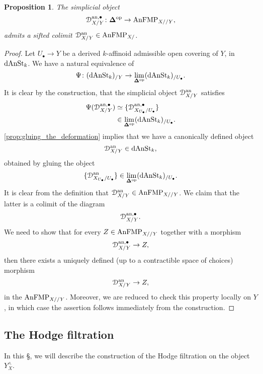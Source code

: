 \documentclass[10pt,a4paper,reqno]{amsart} %
\theoremstyle{plain}
\newtheorem{prop}[thm]{Proposition}
\theoremstyle{definition}
\theoremstyle{remark}
\numberwithin{equation}{section}
\begin{document}
\begin{prop}
    The simplicial object
        \[
            \mathcal D_{X/ Y}^{\mathrm{an}, \bullet} \colon \bm{\Delta} ^\mathrm{op} \to \mathrm{AnFMP}_{X/ /Y},  
        \]
    admits a sifted colimit $\mathcal D_{X/ Y}^\mathrm{an} \in \mathrm{AnFMP}_{X/ }$.
\end{prop}

\begin{proof} Let $U_\bullet \to Y$ be a derived $k$-affinoid admissible open covering of $Y$, in $\mathrm{dAnSt}_k$. We have a natural equivalence of \infcats
        \[
            \Psi \colon (\mathrm{dAnSt}_k)_{/ Y}  \to \lim_{\bm{\Delta} ^\mathrm{op}} (\mathrm{dAnSt}_k)_{/U_\bullet}.
        \]
    It is clear by the construction, that the simplicial object $\mathcal D^\mathrm{an}_{X/ Y}$ satisfies
        \begin{align*}
            \Psi(\mathcal D^{\mathrm{an}, \bullet}_{X/ Y}) & \simeq \{ \mathcal D^{\mathrm{an}, \bullet}_{X_{U_\bullet}/ U_\bullet} \} \\
                                                    & \in \lim_{\bm{\Delta} ^\mathrm{op}} (\mathrm{dAnSt}_k)_{/ U_\bullet}.
        \end{align*}
    \cref{prop:gluing_the_deformation} implies that we have a canonically defined object
        \[
            \mathcal D^\mathrm{an}_{X/ Y} \in \mathrm{dAnSt}_k,  
        \]
    obtained by gluing the object
        \[
            \{ \mathcal D^\mathrm{an}_{X_{U_\bullet}/ U_\bullet} \} \in \lim_{\bm{\Delta} ^\mathrm{op}} (\mathrm{dAnSt}_k)_{/ U_\bullet}.
        \]
    It is clear from the definition that $\mathcal D^\mathrm{an}_{X/ Y} \in \mathrm{AnFMP}_{X/ /Y}$. We claim that the latter is a colimit of the diagram
        \[  
            \mathcal D^{\mathrm{an}, \bullet}_{X/ Y}.
        \]
    We need to show that for every $Z \in \mathrm{AnFMP}_{X/ /Y}$ together with a morphism
        \[
            \mathcal D^{\mathrm{an}, \bullet}_{X/ Y} \to Z,   
        \]
    then there exists a uniquely defined (up to a contractible space of choices) morphism
        \[
            \mathcal D^\mathrm{an}_{X/ Y} \to Z,  
        \]
    in the \infcat $\mathrm{AnFMP}_{X/ /Y}$. Moreover, we are reduced to check this property locally on $Y$, in which case the assertion follows immediately
    from the construction.
\end{proof}


\subsection{The Hodge filtration} In this \S, we will describe the construction of the Hodge filtration on the object $Y^\wedge_X$.
\end{document}

